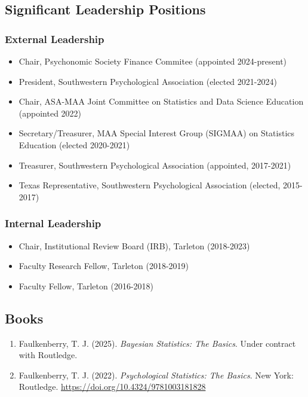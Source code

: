 \documentclass[article,10pt]{article}
\begin{document}
\subsection*{Significant Leadership Positions}
\label{sec:orgad59b4d}
\subsubsection*{External Leadership}
\label{sec:org701469d}

\begin{itemize}
\item Chair, Psychonomic Society Finance Commitee (appointed 2024-present)
\item President, Southwestern Psychological Association (elected 2021-2024)
\item Chair, ASA-MAA Joint Committee on Statistics and Data Science Education (appointed 2022)
\item Secretary/Treasurer, MAA Special Interest Group (SIGMAA) on Statistics Education (elected 2020-2021)
\item Treasurer, Southwestern Psychological Association (appointed, 2017-2021)
\item Texas Representative, Southwestern Psychological Association (elected, 2015-2017)
\end{itemize}

\subsubsection*{Internal Leadership}
\label{sec:orgfd108b2}

\begin{itemize}
\item Chair, Institutional Review Board (IRB), Tarleton (2018-2023)
\item Faculty Research Fellow, Tarleton (2018-2019)
\item Faculty Fellow, Tarleton (2016-2018)
\end{itemize}

\subsection*{Books}
\label{sec:org82c0fb4}
\begin{enumerate}
\item Faulkenberry, T. J. (2025). \emph{Bayesian Statistics: The Basics}. Under contract with Routledge.
\item Faulkenberry, T. J. (2022). \emph{Psychological Statistics: The Basics}. New York: Routledge. \url{https://doi.org/10.4324/9781003181828}
\end{enumerate}
\end{document}
